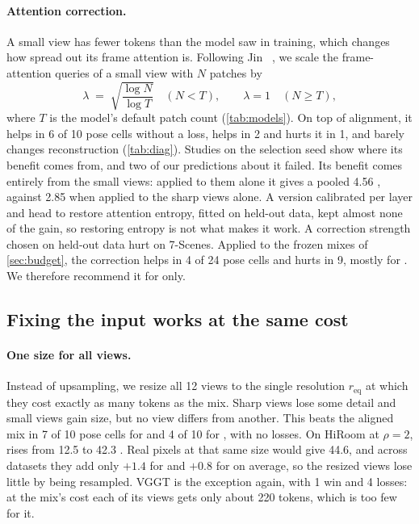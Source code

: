 \paragraph{Attention correction.}
A small view has fewer tokens than the model saw in training, which changes how spread out its frame attention is. Following Jin \etal~\cite{jin2023training}, we scale the frame-attention queries of a small view with $N$ patches by
\begin{equation}
  \lambda \;=\; \sqrt{\frac{\log N}{\log T}}\quad (N<T), \qquad \lambda=1 \quad (N\ge T),
  \label{eq:lambda}
\end{equation}
where $T$ is the model's default patch count (\cref{tab:models}). On top of alignment, it helps \pithree in 6 of 10 pose cells without a loss, helps \dathree in 2 and hurts it in 1, and barely changes reconstruction (\cref{tab:diag}). Studies on the selection seed show where its benefit comes from, and two of our predictions about it failed. Its benefit comes entirely from the small views: applied to them alone it gives \pithree a pooled 4.56 \auc, against 2.85 when applied to the sharp views alone. A version calibrated per layer and head to restore attention entropy, fitted on held-out data, kept almost none of the gain, so restoring entropy is not what makes it work. A correction strength chosen on held-out data hurt \pithree on 7-Scenes. Applied to the frozen mixes of \cref{sec:budget}, the correction helps in 4 of 24 pose cells and hurts in 9, mostly for \dathree. We therefore recommend it for \pithree only.

\subsection{Fixing the input works at the same cost}

\paragraph{One size for all views.}
Instead of upsampling, we resize all 12 views to the single resolution $r_{\mathrm{eq}}$ at which they cost exactly as many tokens as the mix. Sharp views lose some detail and small views gain size, but no view differs from another. This beats the aligned mix in 7 of 10 pose cells for \pithree and 4 of 10 for \dathree, with no losses. On HiRoom at $\rho{=}2$, \pithree rises from 12.5 to 42.3 \auc. Real pixels at that same size would give 44.6, and across datasets they add only $+1.4$ \auc for \pithree and $+0.8$ for \dathree on average, so the resized views lose little by being resampled. VGGT is the exception again, with 1 win and 4 losses: at the mix's cost each of its views gets only about 220 tokens, which is too few for it.

